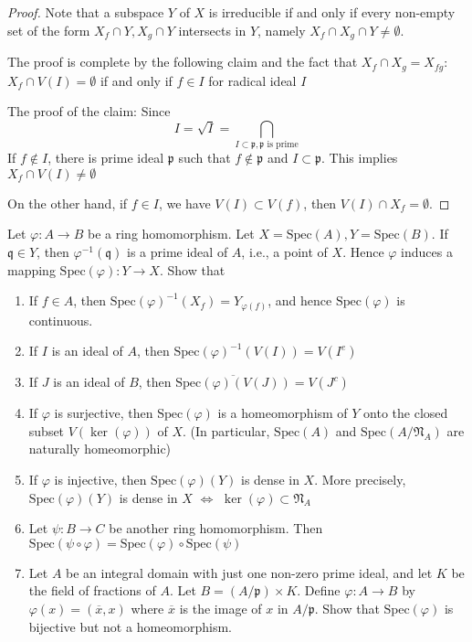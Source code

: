 \documentclass{solution}
\begin{document}
\begin{proof}
    Note that a subspace $Y$ of $X$ is irreducible if and only if every non-empty set of the form $X_f \cap Y, X_g \cap Y$ intersects in $Y$, namely $X_f \cap X_g \cap Y \ne \emptyset$. 
    
    The proof is complete by the following claim and the fact that $X_f \cap X_g = X_{fg}$: $X_f \cap V(I) = \emptyset$ if and only if $f \in I$ for radical ideal $I$

    The proof of the claim: Since
    $$I = \sqrt{I} = \bigcap\limits_{I \subset \mathfrak{p}, \mathfrak{p} \text{ is prime}}$$
    If $f \notin I$, there is prime ideal $\mathfrak{p}$ such that $f \notin \mathfrak{p}$ and $I \subset \mathfrak{p}$. This implies $X_f \cap V(I) \ne \emptyset$

    On the other hand, if $f \in I$, we have $V(I) \subset V(f)$, then $V(I) \cap X_f = \emptyset$.
\end{proof}

\begin{problem}
    Let $\varphi: A \rightarrow B$ be a ring homomorphism. Let $X = \mathrm{Spec}(A), Y = \mathrm{Spec}(B)$. If $\mathfrak{q} \in Y$, then $\varphi ^{-1}(\mathfrak{q})$ is a prime ideal of $A$, i.e., a point of $X$. Hence $\varphi$ induces a mapping $\mathrm{Spec}(\varphi): Y \rightarrow X$. Show that
    \begin{enumerate}
        \item If $f \in A$, then $\mathrm{Spec}(\varphi) ^{-1}(X_f) = Y_{\varphi(f)}$, and hence $\mathrm{Spec}(\varphi)$ is continuous.
        \item If $I$ is an ideal of $A$, then $\mathrm{Spec}(\varphi) ^{-1}(V(I)) = V(I^e)$
        \item If $J$ is an ideal of $B$, then $\overline{\mathrm{Spec}(\varphi)(V(J))} = V(J^c)$
        \item If $\varphi$ is surjective, then $\mathrm{Spec}(\varphi)$ is a homeomorphism of $Y$ onto the closed subset $V(\ker(\varphi))$ of $X$. (In particular, $\mathrm{Spec}(A)$ and $\mathrm{Spec}(A / \mathfrak{N}_A)$ are naturally homeomorphic)
        \item If $\varphi$ is injective, then $\mathrm{Spec}(\varphi)(Y)$ is dense in $X$. More precisely, $\mathrm{Spec}(\varphi)(Y)$ is dense in $X$ $\Leftrightarrow$ $\ker (\varphi) \subset \mathfrak{N}_A$
        \item Let $\psi: B \rightarrow C$ be another ring homomorphism. Then $\mathrm{Spec}(\psi \circ \varphi) = \mathrm{Spec}(\varphi) \circ \mathrm{Spec}(\psi)$
        \item Let $A$ be an integral domain with just one non-zero prime ideal, and let $K$ be the field of fractions of $A$. Let $B = (A / \mathfrak{p}) \times K$. Define $\varphi: A \rightarrow B$ by $\varphi(x) = (\overline{x}, x)$ where $\overline{x}$ is the image of $x$ in $A / \mathfrak{p}$. Show that $\mathrm{Spec}(\varphi)$ is bijective but not a homeomorphism.
    \end{enumerate}
\end{problem}
\end{document}
